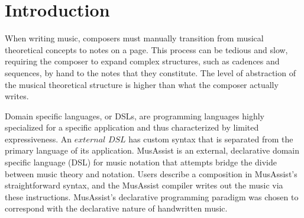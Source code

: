 \documentclass{article}
\title{\papertitle}
\begin{document}
%
\capstartfalse
\maketitle
\capstarttrue
%
\begin{abstract}
MusAssist is an external, declarative domain specific language for music notation. 
Users can change key signatures, start a new measure, and describe musical structures 
such as notes, rests, and custom chords in MusAssist’s straightforward syntax much in 
the same way they would when composing. MusAssist is unique in that users can also describe 
complex musical templates for triads and seventh chords, cadences, and the four primary 
harmonic sequences with desired length. The level of abstraction of a MusAssist template 
MusAssist matches that of the theoretical musical structure it describes (e.g. users can describe
 a harmonic sequence without lowering the abstraction level to chords and notes). This allows 
 users to write out specifications precisely at the conceptual levels of the musical structures 
 they would organically conceive when composing by hand. The musical expressions described by 
 the specifications are expanded out (i.e. the level of abstraction is fully lowered) by the 
 Haskell-based MusAssist compiler and are translated to MusicXML, a language accepted by most 
 major notation software, allowing for further manual editing. 
\end{abstract}
%

\section{Introduction}\label{sec:introduction}
When writing music, composers must manually transition from musical theoretical concepts to notes on a page.
This process can be tedious and slow, requiring the composer to expand complex structures, such as cadences and sequences,
by hand to the notes that they constitute. The level of abstraction of the musical theoretical structure is 
higher than what the composer actually writes. 

Domain specific languages, or DSLs, 
are programming languages highly specialized for a specific application and thus characterized by limited expressiveness.
An $external$ $DSL$ has custom syntax that is separated from the primary language of its application. 
MusAssist is an external, declarative domain specific language (DSL) for music notation that attempts bridge the divide between
music theory and notation. Users describe a composition in MusAssist's straightforward syntax, and 
the MusAssist compiler writes out the music via these instructions. MusAssist's declarative programming 
paradigm was chosen to correspond with the declarative nature of handwritten music. 
\end{document}
